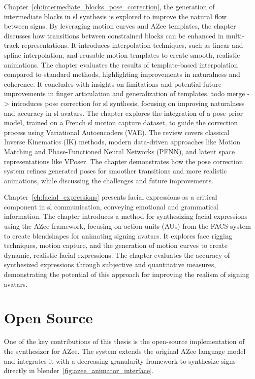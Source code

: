 \documentclass[../../main.tex]{subfiles}
\begin{document}
Chapter~\ref{ch:intermediate_blocks_pose_correction}, the generation of intermediate blocks in \gls{sl} synthesis is explored to improve the natural flow between signs. By leveraging motion curves and AZee templates, the chapter discusses how transitions between constrained blocks can be enhanced in multi-track representations. It introduces interpolation techniques, such as linear and spline interpolation, and reusable motion templates to create smooth, realistic animations. The chapter evaluates the results of template-based interpolation compared to standard methods, highlighting improvements in naturalness and coherence. It concludes with insights on limitations and potential future improvements in finger articulation and generalization of templates. todo merge ->  introduces pose correction for \gls{sl} synthesis, focusing on improving naturalness and accuracy in \gls{sl} avatars. The chapter explores the integration of a pose prior model, trained on a French \gls{sl} motion capture dataset, to guide the correction process using Variational Autoencoders (VAE). The review covers classical Inverse Kinematics (IK) methods, modern data-driven approaches like Motion Matching and Phase-Functioned Neural Networks (PFNN), and latent space representations like VPoser. The chapter demonstrates how the pose correction system refines generated poses for smoother transitions and more realistic animations, while discussing the challenges and future improvements.

Chapter~\ref{ch:facial_expressions} presents facial expressions as a critical component in \gls{sl} communication, conveying emotional and grammatical information. The chapter introduces a method for synthesizing facial expressions using the AZee framework, focusing on action units (AUs) from the FACS system to create blendshapes for animating signing avatars. It explores face rigging techniques, motion capture, and the generation of motion curves to create dynamic, realistic facial expressions. The chapter evaluates the accuracy of synthesized expressions through subjective and quantitative measures, demonstrating the potential of this approach for improving the realism of signing avatars.

\section{Open Source}
\label{ch:conclusion:opensource}

One of the key contributions of this thesis is the open-source implementation of the synthesizor for AZee. The system extends the original AZee language model and integrates it with a decreasing granularity framework to synthesize signs directly in blender~\ref{fig:azee_animator_interface}.
\end{document}
